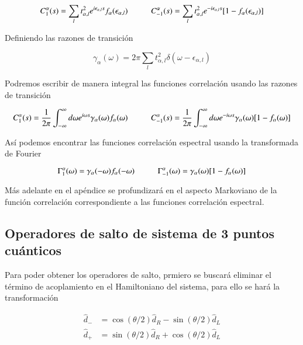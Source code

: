 \begin{appendixs}
\begin{equation*}
    C_{1}^{\alpha}(s) = \sum_{l}t^{2}_{\alpha,l}e^{i\epsilon_{\alpha,l}s} f_{\alpha}(\epsilon_{\alpha,l}) \hspace{10mm} C
    ^{\alpha}_{-1}(s) = \sum_{l}t^{2}_{\alpha,l}e^{-i\epsilon_{\alpha,l}s} [1-f_{\alpha}(\epsilon_{\alpha,l})]
\end{equation*}

Definiendo las razones de transición

\begin{equation*}
    \gamma_{\alpha}(\omega) = 2\pi \sum_{l}t^{2}_{\alpha,l}\delta(\omega-\epsilon_{\alpha,l})
\end{equation*}

Podremos escribir de manera integral las funciones correlación usando las razones de transición

\begin{equation*}
    C_{1}^{\alpha}(s) = \frac{1}{2\pi} \int_{-\infty}^{\infty}d\omega e^{i\omega s} \gamma_{\alpha}(\omega) f_{\alpha}(\omega)  \hspace{10mm} C_{-1}^{\alpha}(s) = \frac{1}{2\pi} \int_{-\infty}^{\infty}d\omega e^{-i\omega s} \gamma_{\alpha}(\omega) [1-f_{\alpha}(\omega)]
\end{equation*}

Así podemos encontrar las funciones correlación espectral usando la transformada de Fourier

\begin{equation*}
    \Gamma_{1}^{\alpha}(\omega) = \gamma_{\alpha}(-\omega)f_{\alpha}(-\omega)  \hspace{10mm} \Gamma_{-1}^{\alpha}(\omega) = \gamma_{\alpha}(\omega)[1-f_{\alpha}(\omega)]
\end{equation*}

Más adelante en el apéndice se profundizará en el aspecto Markoviano de la función correlación correspondiente a las funciones correlación espectral.
\label{apendix5bathcorre}

\subsection{ Operadores de salto de sistema de 3 puntos cuánticos}
Para poder obtener los operadores de salto, prmiero se buscará eliminar el término de acoplamiento en el Hamiltoniano del sistema, para ello se hará la transformación

\begin{align*}
    \hat{d}_{-} & = \cos(\theta/2)\hat{d}_{R} - \sin(\theta/2)\hat{d}_{L} \\
    \hat{d}_{+} & = \sin(\theta/2)\hat{d}_{R} + \cos(\theta/2)\hat{d}_{L}
\end{align*}



\end{appendixs}
